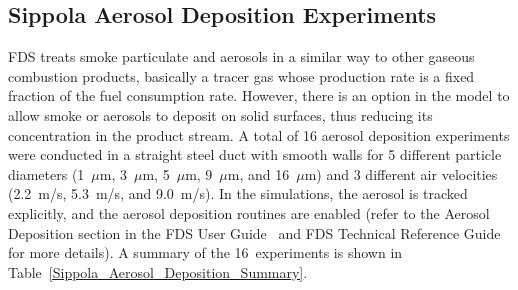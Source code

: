 \clearpage

\subsection{Sippola Aerosol Deposition Experiments}
\label{Aerosol Deposition Velocity}

FDS treats smoke particulate and aerosols in a similar way to other gaseous combustion products, basically a tracer gas whose production rate is a fixed fraction of the fuel consumption rate. However, there is an option in the model to allow smoke or aerosols to deposit on solid surfaces, thus reducing its concentration in the product stream. A total of 16 aerosol deposition experiments were conducted in a straight steel duct with smooth walls for 5 different particle diameters (1~$\mu$m, 3~$\mu$m, 5~$\mu$m, 9~$\mu$m, and 16~$\mu$m) and 3 different air velocities (2.2~m/s, 5.3~m/s, and 9.0~m/s). In the simulations, the aerosol is tracked explicitly, and the aerosol deposition routines are enabled (refer to the Aerosol Deposition section in the FDS User Guide~\cite{FDS_Users_Guide} and FDS Technical Reference Guide~\cite{FDS_Math_Guide} for more details). A summary of the 16~experiments is shown in Table~\ref{Sippola_Aerosol_Deposition_Summary}.

